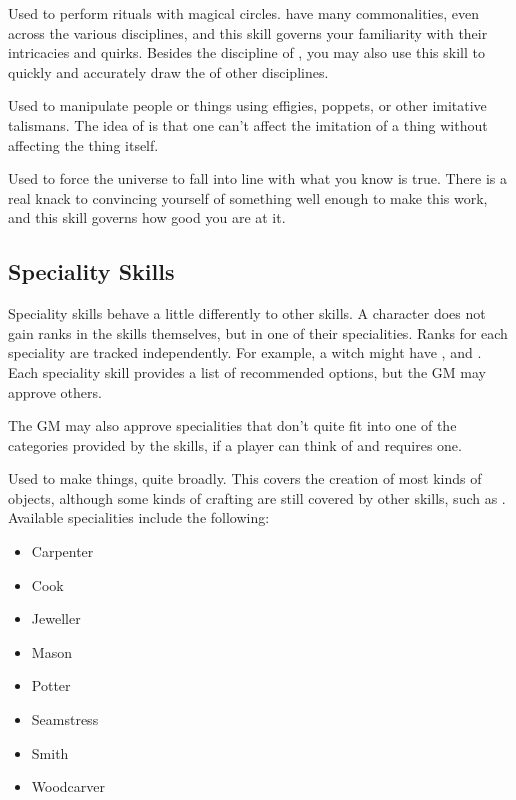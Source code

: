 
Used to perform rituals with magical circles.
 have many commonalities, even across the various disciplines, and this skill governs your familiarity with their intricacies and quirks.
Besides the discipline of , you may also use this skill to quickly and accurately draw the  of other disciplines.


Used to manipulate people or things using effigies, poppets, or other imitative talismans.
The idea of  is that one can't affect the imitation of a thing without affecting the thing itself.


Used to force the universe to fall into line with what you know is true.
There is a real knack to convincing yourself of something well enough to make this work, and this skill governs how good you are at it.

\subsection{Speciality Skills}

Speciality skills behave a little differently to other skills.
A character does not gain ranks in the skills themselves, but in one of their specialities.
Ranks for each speciality are tracked independently.
For example, a witch might have ,  and .
Each speciality skill provides a list of recommended options, but the GM may approve others.

The GM may also approve specialities that don't quite fit into one of the categories provided by the skills, if a player can think of and requires one.


Used to make things, quite broadly.
This covers the creation of most kinds of objects, although some kinds of crafting are still covered by other skills, such as .
Available specialities include the following:

\begin{itemize}
	\item Carpenter
	\item Cook
	\item Jeweller
	\item Mason
	\item Potter
	\item Seamstress
	\item Smith
	\item Woodcarver
\end{itemize}

